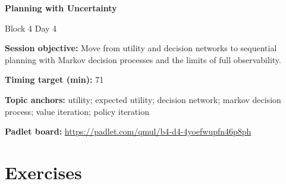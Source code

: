 \documentclass[11pt]{article}
\begin{document}
\begin{center}\LARGE\bfseries Planning with Uncertainty\end{center}

\begin{center}\large Block 4 Day 4\end{center}

\begin{tcolorbox}[colback=MidnightBlue!4,colframe=MidnightBlue,title={Session Overview},fonttitle=\bfseries,breakable]
\textbf{Session objective:} Move from utility and decision networks to sequential planning with Markov decision processes and the limits of full observability.

\textbf{Timing target (min):} 71

\textbf{Topic anchors:} utility; expected utility; decision network; markov decision process; value iteration; policy iteration

\textbf{Padlet board:} \url{https://padlet.com/qmul/b4-d4-4yoefwupfn46p8ph}
\end{tcolorbox}

\section*{Exercises}
\end{document}

